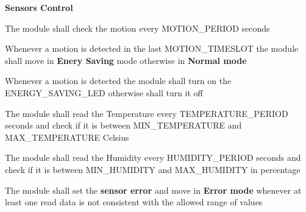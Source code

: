 \begin{req_enum}
				\item \textbf{Sensors Control}
					\begin{req_enum}[label*=\arabic*.]
						\item The module shall check the motion every MOTION\_PERIOD seconds
						\item Whenever a motion is detected in the last MOTION\_TIMESLOT the module shall move in \textbf{Enery Saving} mode otherwise in \textbf{Normal mode}
						\item Whenever a motion is detected the module shall turn on the ENERGY\_SAVING\_LED otherwise shall turn it off
						\item The module shall read the Temperature every TEMPERATURE\_PERIOD seconds and check if it is between MIN\_TEMPERATURE and MAX\_TEMPERATURE Celsius \degree
						\item The module shall read the Humidity every HUMIDITY\_PERIOD seconds and check if it is between MIN\_HUMIDITY and MAX\_HUMIDITY in percentage
						\item The module shall set the \textbf{sensor error} and move in \textbf{Error mode} whenever at least one read data is not consistent with the allowed range of values
					\end{req_enum}
	

\end{req_enum}
